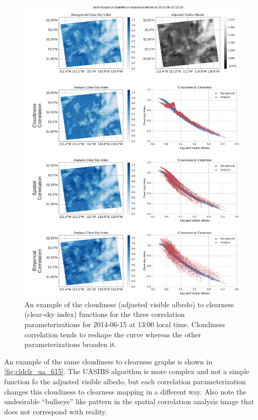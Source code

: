 \begin{figure}[p]
\centering
\includegraphics[width=\textwidth]{figs/cld_to_clear_Semi-Empirical_2014-06-15.pdf}
\caption[Clearness versus Cloudiness for SE model on 6/15]{An example
  of the cloudiness (adjusted visible albedo) to clearness (clear-sky
  index) functions for the three correlation parameterizations for
  2014-06-15 at 13:00 local time. Cloudiness correlation tends to
  reshape the curve whereas the other parameterizations broaden it.}
\label{fig:cldclr_se_615}
\end{figure}

An example of the same cloudiness to clearness graphs is shown in
\cref{fig:cldclr_ua_615}.
The UASIBS algorithm is more complex and not a simple function
fo the adjusted visible albedo, but each correlation parameterization
changes this cloudiness to clearness mapping in a different way.
Also note the undesirable ``bullseye'' like pattern in the spatial
correlation analysis image that does not correspond with reality.

